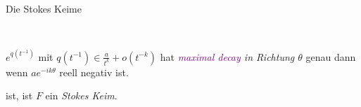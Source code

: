 \begin{frame}{Die Stokes Keime}
\begin{defn}
\begin{itemize}
\begin{enumerate}
{\begin{minipage}{\textwidth}
\begin{flushright}
              \begin{minipage}{.6\textwidth}
                ~
                \vspace{-2em}
                \begin{defn}
                  $e^{q(t^{-1})}$ mit $q(t^{-1})\in\frac{a}{t^{k}}+o(t^{-k})$
                  hat \emph{\textcolor{purple}{maximal decay} in Richtung
                    \boldmath$\theta$} genau dann wenn $ae^{-ik\theta}$ reell
                  negativ ist.
                \end{defn}
              \end{minipage}
            \end{flushright}
          \end{minipage}
        }
      \end{enumerate}
      ist, ist $F$ ein \emph{Stokes Keim}.
    \end{itemize}
  \end{defn}
\end{frame}
